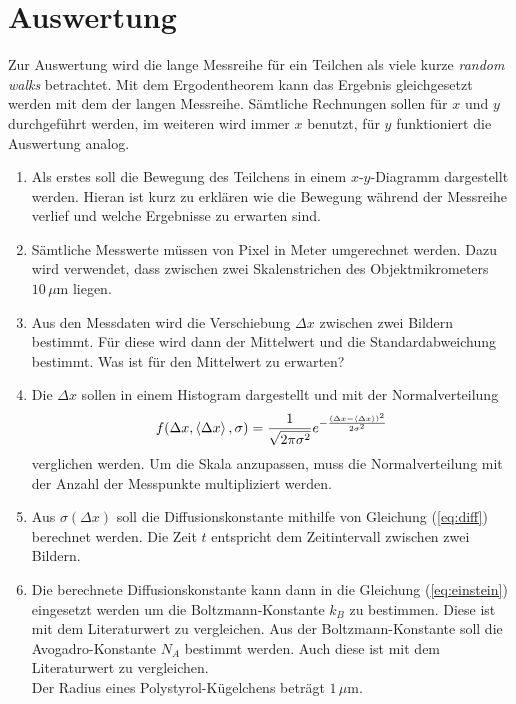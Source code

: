 \section*{Auswertung}

Zur Auswertung wird die lange Messreihe für ein Teilchen als viele kurze \emph{random walks} betrachtet. Mit dem Ergodentheorem kann das Ergebnis gleichgesetzt werden mit dem der langen Messreihe.
Sämtliche Rechnungen sollen für $x$ und $y$ durchgeführt werden, im weiteren wird immer $x$ benutzt, für $y$ funktioniert die Auswertung analog.

\begin{enumerate}
\item Als erstes soll die Bewegung des Teilchens in einem $x$-$y$-Diagramm dargestellt werden. Hieran ist kurz zu erklären wie die Bewegung während der Messreihe verlief und welche Ergebnisse zu erwarten sind.

\item Sämtliche Messwerte müssen von Pixel in Meter umgerechnet werden. Dazu wird verwendet, dass zwischen zwei Skalenstrichen des Objektmikrometers $10\, \mu$m liegen.

\item Aus den Messdaten wird die Verschiebung $\Delta x$ zwischen zwei Bildern bestimmt. Für diese wird dann der Mittelwert und die Standardabweichung bestimmt. Was ist für den Mittelwert zu erwarten?

\item Die $\Delta x$ sollen in einem Histogram dargestellt und mit der Normalverteilung
\begin{equation}
  f(\Delta x, \left< \Delta x \right>, \sigma) = \frac{1}{\sqrt{2 \pi \sigma^2}} e^{- \frac{(\Delta x - \left< \Delta x \right>)^2}{2 \sigma^2}}
\end{equation}
verglichen werden. Um die Skala anzupassen, muss die Normalverteilung mit der Anzahl der Messpunkte multipliziert werden.

\item Aus $\sigma(\Delta x)$ soll die Diffusionskonstante mithilfe von Gleichung (\ref{eq:diff}) berechnet werden. Die Zeit $t$ entspricht dem Zeitintervall zwischen zwei Bildern.

\item Die berechnete Diffusionskonstante kann dann in die Gleichung (\ref{eq:einstein}) eingesetzt werden um die Boltzmann-Konstante $k_B$ zu bestimmen. Diese ist mit dem Literaturwert zu vergleichen. Aus der Boltzmann-Konstante soll die Avogadro-Konstante $N_A$ bestimmt werden. Auch diese ist mit dem Literaturwert zu vergleichen.\\
Der Radius eines Polystyrol-Kügelchens beträgt $1\,\mu$m.
\end{enumerate}



